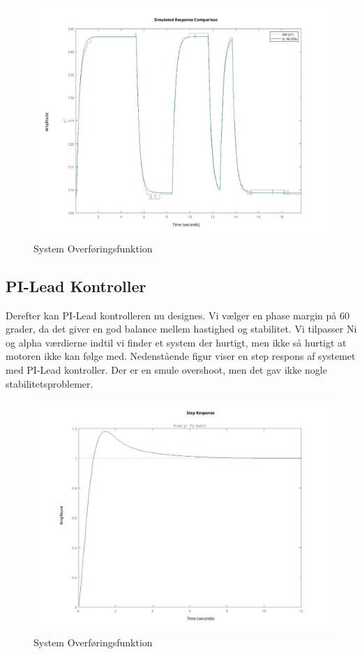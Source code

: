 \documentclass[../main.tex]{subfiles}
\begin{document}
\begin{figure}[H]
      \includegraphics[width=\textwidth]{Dokumentation/Figures/Motor Model Fit.jpg}
     \caption{System Overføringsfunktion}
     \label{fig: System Overføringsfunktion}
     \end{figure}

\subsection{PI-Lead Kontroller}
Derefter kan PI-Lead kontrolleren nu designes. Vi vælger en phase margin på 60 grader, da det giver en god balance mellem hastighed og stabilitet. Vi tilpasser Ni og alpha værdierne indtil vi finder et system der hurtigt, men ikke så hurtigt at motoren ikke kan følge med. Nedenstående figur viser en step respons af systemet med PI-Lead kontroller. Der er en smule overshoot, men det gav ikke nogle stabilitetsproblemer.

\begin{figure}[H]
      \includegraphics[width=\textwidth]{Dokumentation/Figures/Motor PID Step Response.jpg}
     \caption{System Overføringsfunktion}
     \label{fig: System Overføringsfunktion}
     \end{figure}
\end{document}
